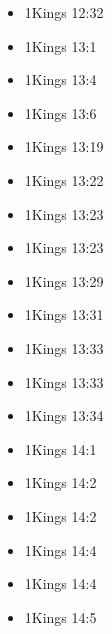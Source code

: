 \documentclass[14pt]{article}
\begin{document}
\begin{multicols}{2}
\begin{itemize}
											\item 1Kings 12:32
											
											\item 1Kings 13:1
											
											\item 1Kings 13:4
											
											\item 1Kings 13:6
											
											\item 1Kings 13:19
											
											\item 1Kings 13:22
											
											\item 1Kings 13:23
											
											\item 1Kings 13:23
											
											\item 1Kings 13:29
											
											\item 1Kings 13:31
											
											\item 1Kings 13:33
											
											\item 1Kings 13:33
											
											\item 1Kings 13:34
											
											\item 1Kings 14:1
											
											\item 1Kings 14:2
											
											\item 1Kings 14:2
											
											\item 1Kings 14:4
											
											\item 1Kings 14:4
											
											\item 1Kings 14:5
											

\end{itemize}
\end{multicols}
\end{document}
